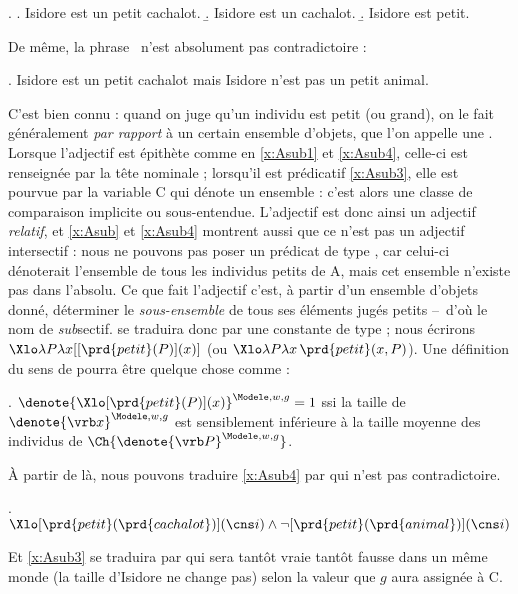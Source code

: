 \ex. \label{x:Asub}
\a. Isidore est un petit cachalot.\label{x:Asub1}
\b. Isidore est un cachalot.\label{x:Asub2}
\b. Isidore est petit.\label{x:Asub3}

De même, la phrase \Next\ n'est absolument pas contradictoire :

\ex. 
Isidore est un petit cachalot mais Isidore n'est pas un petit animal.\label{x:Asub4}



C'est bien connu : quand on juge qu'un individu est petit (ou grand), on le fait généralement \emph{par rapport} à un certain ensemble d'objets, que l'on appelle une .
Lorsque l'adjectif est épithète comme en \ref{x:Asub1} et \ref{x:Asub4}, celle-ci est renseignée par la tête nominale ; lorsqu'il est prédicatif \ref{x:Asub3}, elle est pourvue par la variable \vrb C qui dénote un ensemble : c'est alors une classe de comparaison implicite ou sous-entendue. 
L'adjectif  est donc ainsi un adjectif \emph{relatif}, et \ref{x:Asub} et \ref{x:Asub4} montrent aussi que ce n'est pas un adjectif intersectif : nous ne pouvons pas poser un prédicat  de type \et, car celui-ci dénoterait l'ensemble de tous les individus petits de \Unv A, mais cet ensemble n'existe pas dans l'absolu. 
Ce que fait l'adjectif c'est, à partir d'un ensemble d'objets donné, déterminer le \emph{sous-ensemble} de tous ses éléments jugés petits --~d'où le nom de \emph{sub}sectif.
 se traduira donc par une constante de type \type{\et,\et} ; nous écrirons  \(\Xlo\lambda P\lambda x [[\prd{petit}(P)](x)]\) (ou \(\Xlo\lambda P\lambda x \,\prd{petit}(x,P)\)).\label{p.petitA}
Une définition du sens de  pourra être quelque chose comme :

\ex. \(\denote{\Xlo[\prd{petit}(P)](x)}^{\Modele,w,g}=1\) ssi la taille de \(\denote{\vrb x}^{\Modele,w,g}\) est sensiblement inférieure à la taille moyenne des individus de \(\Ch{\denote{\vrb P}^{\Modele,w,g}}\).


À partir de là, nous pouvons traduire \ref{x:Asub4} par {\Next} qui n'est pas contradictoire.

\ex.
\(\Xlo[\prd{petit}(\prd{cachalot})](\cns i) \wedge \neg[\prd{petit}(\prd{animal})](\cns i)\)


Et \ref{x:Asub3} se traduira par {\Next} qui sera tantôt vraie tantôt fausse dans un même monde (la taille d'Isidore ne change pas) selon la valeur que $g$ aura assignée à \vrb C.

